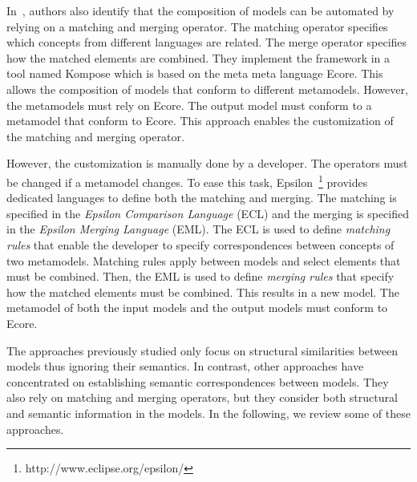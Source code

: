 In~\cite{kompose}, authors also identify that the composition of models can be automated by relying on a matching and merging operator. The matching operator specifies which concepts from different languages are related. The merge operator specifies how the matched elements are combined. They implement the framework in a tool named Kompose which is based on the meta meta language Ecore. This allows the composition of models that conform to different metamodels. However, the metamodels must rely on Ecore. The output model must conform to a metamodel that conform to Ecore. This approach enables the customization of the matching and merging operator. 

However, the customization is manually done by a developer. The operators must be changed if a metamodel changes. To ease this task, Epsilon~\cite{epsilon}\footnote{http://www.eclipse.org/epsilon/} provides dedicated languages to define both the matching and merging. The matching is specified in the \emph{Epsilon Comparison Language} (ECL) and the merging is specified in the \emph{Epsilon Merging Language} (EML). The ECL is used to define \emph{matching rules} that enable the developer to specify correspondences between concepts of two metamodels. Matching rules apply between models and select elements that must be combined. Then, the EML is used to define \emph{merging rules} that specify how the matched elements must be combined. This results in a new model. The metamodel of both the input models and the output models must conform to Ecore.

The approaches previously studied only focus on structural similarities between models thus ignoring their semantics. In contrast, other approaches have concentrated on establishing semantic correspondences between models. They also rely on matching and merging operators, but they consider both structural and semantic information in the models. In the following, we review some of these approaches.  

